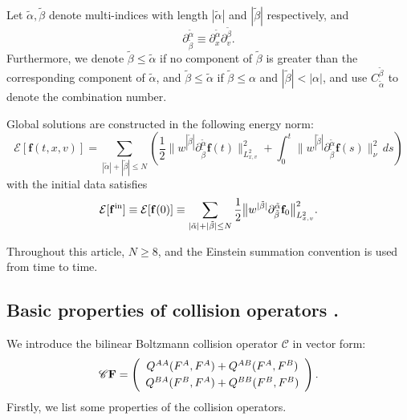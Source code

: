 \documentclass[reqno]{amsart}
\numberwithin{equation}{section}
\numberwithin{equation}{section}
\begin{document}
Let $\tilde{\alpha}, \tilde{\beta}$ denote multi-indices with length $|\tilde{\alpha}|$ and $|\tilde{\beta}|$ respectively, and 
\begin{equation*}
	\partial^{\tilde{\alpha}}_{\tilde{\beta}} \equiv \partial_x^{\tilde{\alpha}} \partial_v^{\tilde{\beta}}.
\end{equation*}
Furthermore, we denote $\tilde{\beta} \leq \tilde{\alpha}$ if no component of $\tilde{\beta}$ is greater than the corresponding component of $\tilde{\alpha}$, and $\tilde{\beta} \leq \tilde{\alpha}$ if $\tilde{\beta} \leq \alpha$ and $|\tilde{\beta}| < |\alpha|$, and use 
$C^{\tilde{\beta}}_{\tilde{\alpha}}$ to denote the combination number.

Global solutions are constructed in the following energy norm:
\begin{equation}\label{DFenergynorm}
	\mathcal{E}[\mathbf{f}(t, x, v)] =  \sum_{|\tilde{\alpha}|+|\tilde{\beta}|\leq N}  \left( \frac{1}{2} \big\| w^{|\tilde{\beta}|} \partial_{\tilde{\beta}}^{\tilde{\alpha}} \mathbf{f}(t) \big\|_{L^{2}_{x,v}}^2 + \int_0^t \big\| w^{|\tilde{\beta}|} \partial_{\tilde{\beta}}^{\tilde{\alpha}} \mathbf{f}(s) \big\|^2_\nu \, ds \right)
\end{equation}
with the initial data satisfies
\begin{equation*}
	\mathcal{E}[\mathbf{f}^{\rm{in}}] \equiv  \mathcal{E}[\mathbf{f}(0)] \equiv \sum_{|\tilde{\alpha}|+|\tilde{\beta}|\leq N}  \frac{1}{2} \big\| w^{|\tilde{\beta}|} \partial_{\tilde{\beta}}^{\tilde{\alpha}} \mathbf{f}_0 \big\|^2_{L^{2}_{x,v}}. 
\end{equation*}


Throughout this article, $ N \geq 8 $, and the Einstein summation convention is used 
from time to time.





	\subsection{Basic properties of collision operators \cite{BoudinSC7}.}

We introduce the bilinear Boltzmann collision operator $\mathscr C $ in vector form: 
\begin{equation}\label{equation1.4}
	\mathscr{C} \mathbf{F} =
	\left(
	\begin{array}{cccc}
		Q^{AA}(F^A,F^A)+Q^{AB}(F^A,F^B)\vspace{3pt}\\
		Q^{BA}(F^B,F^A)+Q^{BB}(F^B,F^B)
	\end{array}
	\right).
\end{equation}
Firstly, we list some  properties of the collision operators. 
\end{document}
